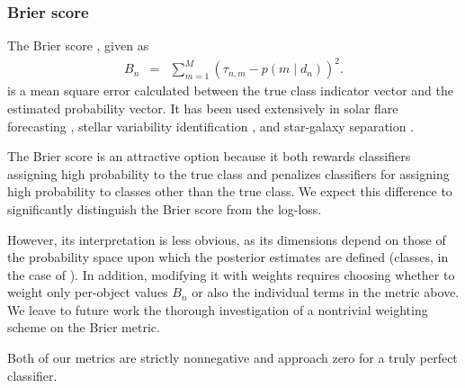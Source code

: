 \subsubsection{Brier score}
\label{sec:brier}

The Brier score \citep{brier_verification_1950}, given as
\begin{eqnarray}
  \label{eq:brier}
B_{n} &=& \sum_{m=1}^{M}(\tau_{n, m}-p(m \mid d_{n}))^{2}.
\end{eqnarray}
is a mean square error calculated between the true class indicator vector and the estimated probability vector.
It has been used extensively in solar flare forecasting \citep{crown_validation_2012, mays_ensemble_2015, florios_forecasting_2018}, stellar variability identification \citep{richards_construction_2012, armstrong_k2_2016}, and star-galaxy separation \citep{kim_hybrid_2015}.

The Brier score is an attractive option because it both rewards classifiers assigning high probability to the true class and penalizes classifiers for assigning high probability to classes other than the true class.
We expect this difference to significantly distinguish the Brier score from the log-loss.

However, its interpretation is less obvious, as its dimensions depend on those of the probability space upon which the posterior estimates are defined (classes, in the case of \plasticc).
In addition, modifying it with weights requires choosing whether to weight only per-object values $B_{n}$ or also the individual terms in the metric above.
We leave to future work the thorough investigation of a nontrivial weighting scheme on the Brier metric.


%
Both of our metrics are strictly nonnegative and approach zero for a truly perfect classifier.

